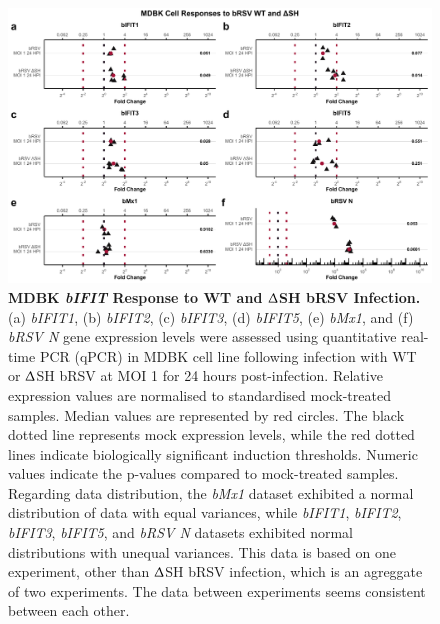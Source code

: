 \begin{figure}
    \centering
    \includegraphics[width=1\linewidth]{07. Chapter 2/Figs/02. Induction/05. mdbk_brsv_moi1_dsh.pdf}
    \caption[MDBK \textit{bIFIT} Response to WT and $\Updelta$SH bRSV Infection.]{\textbf{MDBK \textit{bIFIT} Response to WT and $\Updelta$SH bRSV Infection.} (a) \textit{bIFIT1}, (b) \textit{bIFIT2}, (c) \textit{bIFIT3}, (d) \textit{bIFIT5}, (e) \textit{bMx1}, and (f) \textit{bRSV N} gene expression levels were assessed using quantitative real-time PCR (qPCR) in MDBK cell line following infection with WT or $\Updelta$SH bRSV at MOI 1 for 24 hours post-infection. Relative expression values are normalised to standardised mock-treated samples. Median values are represented by red circles. The black dotted line represents mock expression levels, while the red dotted lines indicate biologically significant induction thresholds. Numeric values indicate the p-values compared to mock-treated samples. Regarding data distribution, the \textit{bMx1} dataset exhibited a normal distribution of data with equal variances, while \textit{bIFIT1}, \textit{bIFIT2}, \textit{bIFIT3}, \textit{bIFIT5}, and \textit{bRSV N} datasets exhibited normal distributions with unequal variances. This data is based on one experiment, other than $\Updelta$SH bRSV infection, which is an agreggate of two experiments. The data between experiments seems consistent between each other.}
    \label{fig:MDBK responses to dSH}
\end{figure}

